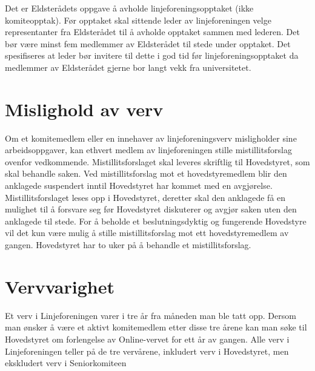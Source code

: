  {
Det er Eldsterådets oppgave å avholde linjeforeningsopptaket (ikke komiteopptak). Før opptaket skal
sittende leder av linjeforeningen \linebreak velge representanter fra Eldsterådet til å avholde opptaket sammen med lederen. Det bør være minst fem medlemmer av Eldsterådet til stede \linebreak under opptaket. Det spesifiseres at leder bør invitere til dette i god tid før linjeforeningsopptaket da medlemmer av Eldsterådet gjerne bor langt vekk fra universitetet.
}

\section{Mislighold av verv}
Om et komitemedlem eller en innehaver av linjeforeningsverv misligholder sine arbeidsoppgaver, kan ethvert medlem av linjeforeningen stille mistillitsforslag ovenfor vedkommende. Mistillitsforslaget skal leveres skriftlig til Hovedstyret, som skal behandle saken. Ved mistillitsforslag mot et hovedstyremedlem blir den anklagede suspendert inntil Hovedstyret har kommet med en avgjørelse. Mistillitsforslaget leses opp i Hovedstyret, deretter skal den anklagede få en mulighet til å forsvare seg før Hovedstyret diskuterer og avgjør saken uten den anklagede til stede. For å beholde et beslutningsdyktig og fungerende Hovedstyre vil det kun være mulig å stille mistillitsforslag mot ett hovedstyremedlem av gangen. Hovedstyret har to uker på å behandle et mistillitsforslag.


\section{Vervvarighet}
Et verv i Linjeforeningen varer i tre år fra måneden man ble tatt opp. Dersom man ønsker å være et aktivt komitemedlem etter disse tre årene kan man søke til Hovedstyret om forlengelse av Online-vervet for ett år av gangen. Alle verv i Linjeforeningen teller på de tre vervårene, inkludert verv i Hovedstyret, men ekskludert verv i Seniorkomiteen

\newpage
